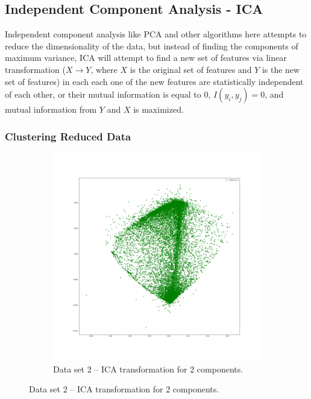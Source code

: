 \documentclass[
letterpaper, %
]{IEEEtran}
\begin{document}
	\subsection{Independent Component Analysis - ICA}
	Independent component analysis like PCA and other algorithms here attempts to reduce the dimensionality of the data, but instead of finding the components of maximum variance, ICA will attempt to find a new set of features via linear transformation ($X \rightarrow Y$, where $X$ is the original set of features and $Y$ is the new set of features) in each each one of the new features are statistically independent of each other, or their mutual information is equal to 0, $I(y_i, y_j) =0$, and mutual information from $Y$ and $X$ is maximized.
	
	\subsubsection{Clustering Reduced Data}
	\begin{figure}[!b]
		\begin{subfigure}{1.0\linewidth}
			\centering
			\includegraphics[width=\linewidth]{./images/ds2/ica/scatter/2components.png}
			\caption{Data set 2 -- ICA transformation for 2 components.}
			\label{fig:icads1scatter2}
		\end{subfigure}
	\end{figure}
\end{document}
